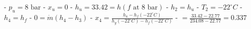- \( p_u = 8 \text{ bar} \)
- \( x_u = 0 \)
- \( h_u = 33.42 = h(f \text{ at } 8 \text{ bar}) \)
- \( h_2 = h_u \)
- \( T_2 = -22^\circ C \)
- \( h_4 = h_f \)
- \( 0 = \dot{m}(h_4 - h_3) \)
- \( x_4 = \frac{h_4 - h_f(-22^\circ C)}{h_g(-22^\circ C) - h_f(-22^\circ C)} \)
- \( = \frac{33.42 - 22.77}{234.08 - 22.77} = 0.337 \)